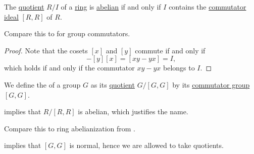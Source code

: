 \begin{proposition}\label{thm:quotient_is_abelian_iff_ideal_contains_commutator}
  The \hyperref[def:ring/quotient]{quotient} \( R / I \) of a \hyperref[def:ring]{ring} is \hyperref[def:abelian_group]{abelian} if and only if \( I \) contains the \hyperref[def:ring_commutator]{commutator ideal} \( [R, R] \) of \( R \).
\end{proposition}
\begin{comments}
  \item Compare this to  for group commutators.
\end{comments}
\begin{proof}
  Note that the cosets \( [x] \) and \( [y] \) commute if and only if
  \begin{equation*}
    [x] [y] - [y] [x] = [xy - yx] = I,
  \end{equation*}
  which holds if and only if the commutator \( xy - yx \) belongs to \( I \).
\end{proof}

\begin{definition}\label{def:ring_abelianization}
   We define the  of a group \( G \) as its \hyperref[def:group/quotient]{quotient} \( G / [G, G] \) by its \hyperref[def:group_commutator]{commutator group} \( [G, G] \).
\end{definition}
\begin{comments}
  \item {} implies that \( R / [R, R] \) is abelian, which justifies the name.
  \item Compare this to ring abelianization from .
\end{comments}
\begin{defproof}
   implies that \( [G, G] \) is normal, hence we are allowed to take quotients.
\end{defproof}

